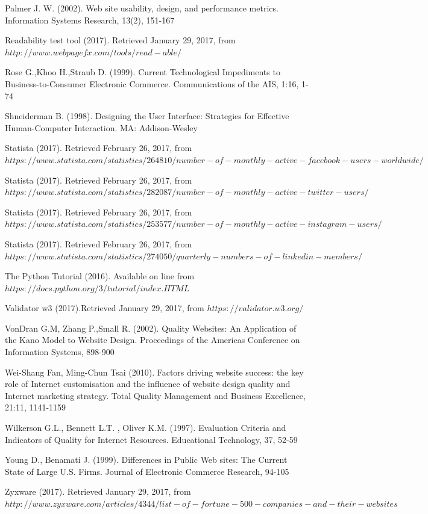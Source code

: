 \documentclass{book}
\begin{document}
\begin{thebibliography}{widest-label}
Palmer J. W. (2002). Web site usability, design, and performance metrics. Information Systems Research, 13(2), 151-167

Readability test tool (2017). Retrieved January 29, 2017, from $http://www.webpagefx.com/tools/read-able/$

Rose G.,Khoo H.,Straub D. (1999). Current Technological Impediments to Business-to-Consumer Electronic
Commerce. Communications of the AIS, 1:16, 1-74

Shneiderman B. (1998). Designing the User Interface: Strategies for Effective Human-Computer Interaction. 
MA: Addison-Wesley

Statista (2017). Retrieved February 26, 2017, from $https://www.statista.com/statistics/264810/number-of-monthly-active-facebook-users-worldwide/$

Statista (2017). Retrieved February 26, 2017, from $https://www.statista.com/statistics/282087/number-of-monthly-active-twitter-users/$

Statista (2017). Retrieved February 26, 2017, from $https://www.statista.com/statistics/253577/number-of-monthly-active-instagram-users/$

Statista (2017). Retrieved February 26, 2017, from $https://www.statista.com/statistics/274050/quarterly-numbers-of-linkedin-members/$

The Python Tutorial (2016). Available on line from $https://docs.python.org/3/tutorial/index.HTML$


Validator w3 (2017).Retrieved January 29, 2017, from $https://validator.w3.org/$

VonDran G.M, Zhang P.,Small R. (2002). Quality
Websites: An Application of the Kano Model to Website Design. Proceedings of the Americas Conference on Information Systems, 898-900

Wei-Shang Fan, Ming-Chun Tsai (2010). Factors driving website success: the key role of Internet customisation and the influence of website design quality and Internet
marketing strategy. Total Quality Management and Business Excellence, 21:11, 1141-1159

Wilkerson G.L., Bennett L.T. , Oliver K.M. (1997). Evaluation Criteria and Indicators of Quality for Internet Resources. Educational Technology, 37, 52-59

Young D., Benamati J. (1999). Differences in Public Web sites: The Current State of Large U.S. Firms. Journal of Electronic Commerce Research, 94-105

Zyxware (2017). Retrieved January 29, 2017, from $http://www.zyxware.com/articles/4344/list-of-fortune-500-companies-and-their-websites$
\end{thebibliography}
\newpage
\appendix
\end{document}
